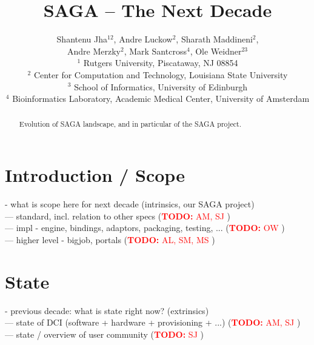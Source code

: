 \documentclass{article}
\newcommand{\B}[1]{\textbf{#1}}
\newcommand{\nind}{\noindent}
\newcommand{\todo}[1]{{\textcolor{red}{\B{TODO:} #1 }}}
\begin{document}
\title{\large SAGA -- The Next Decade}

\author{
        Shantenu Jha$^{12}$,
        Andre Luckow$^{2}$,
        Sharath Maddineni$^{2}$,\\
        Andre Merzky$^{2}$,
        Mark Santcross$^{4}$,
        Ole Weidner$^{23}$
        \\[1em]
        $^1$\small
         Rutgers University, 
         Piscataway, NJ 08854\\[-0.3em]
        $^2$ \small
          Center for Computation and Technology, 
          Louisiana State University\\[-0.3em]
        $^3$ \small
          School of Informatics, 
          University of Edinburgh \\[-0.3em]  
        $^4$ \small
         Bioinformatics Laboratory, Academic Medical Center, 
         University of Amsterdam\\[-0.3em]
       }

\maketitle

\begin{abstract}
 Evolution of SAGA landscape, and in particular of the SAGA project.
\end{abstract}

\section{Introduction / Scope}

  \nind
  - what is scope here for next decade (intrinsics, our SAGA project)\\
  --- standard, incl. relation to other specs (\todo{AM, SJ} )\\
  --- impl - engine, bindings, adaptors, packaging, testing, ... (\todo{OW})\\
  --- higher level - bigjob, portals (\todo{AL, SM, MS})\\
      


\section{State}

    \nind
    - previous decade: what is state right now? (extrinsics)\\
    --- state of DCI (software + hardware + provisioning + ...) (\todo{AM, SJ})\\
    --- state / overview of user community (\todo{SJ})\\
\end{document}
